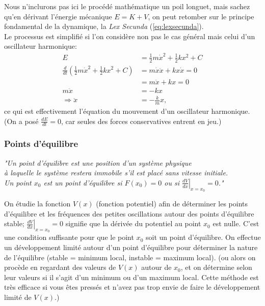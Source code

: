 \documentclass{article}
\numberwithin{equation}{section}
\begin{document}
Nous n'inclurons pas ici le procédé mathématique un poil longuet, mais sachez qu'en dérivant l'énergie mécanique \(E = K + V\), on peut retomber sur le principe fondamental de la dynamique, la \emph{Lex Secunda} (\ref{eq:lexsecunda}). \\
Le processus est simplifié si l'on considère non pas le cas général mais celui d'un oscillateur harmonique:
\begin{align*}
	E &= \frac{1}{2} m \dot x^2 + \frac{1}{2} k x^2 + C \\
	\frac{d}{dt}\left ( \frac{1}{2} m \dot x^2 + \frac{1}{2} k x^2 + C \right ) &= m \dot x \ddot x + k x \dot x = 0 \\
	&= m \ddot x + k x = 0 \\
	m \ddot x &= -k x \\
	\Rightarrow \ddot x &= -\frac{k}{m} x,
\end{align*}
ce qui est effectivement l'équation du mouvement d'un oscillateur harmonique. \\
(On a posé \(\frac{dE}{dt} = 0\), car seules des forces conservatives entrent en jeu.)

\subsubsection{Points d'équilibre}
\begin{center}
	\emph{"Un point d'équilibre est une position d'un système physique \\ à laquelle le système restera immobile s'il est placé sans vitesse initiale. \\ Un point \(x_0\) est un point d'équilibre si \(F(x_0) = 0\) ou si \(\left . \frac{dV}{dx} \right \rvert_{x=x_0} = 0\)."} %
\end{center}
On étudie la fonction \(V(x)\) (fonction potentiel) afin de déterminer les points d'équilibre et les fréquences des petites oscillations autour des points d'équilibre stable; \(\left . \frac{dV}{dx} \right \rvert_{x=x_0} = 0\) signifie que la dérivée du potentiel au point \(x_0\) est nulle. C'est une condition suffisante pour que le point \(x_0\) soit un point d'équilibre. On effectue un développement limité autour d'un point d'équilibre pour déterminer la nature de l'équilibre (stable = minimum local, instable = maximum local). (ou alors on procède en regardant des valeurs de \(V(x)\) autour de \(x_0\), et on détermine selon leur valeurs si il s'agit d'un minimum ou d'un maximum local. Cette méthode est très efficace si vous êtes pressés et n'avez pas trop envie de faire le développement limité de \(V(x)\).)
\end{document}
